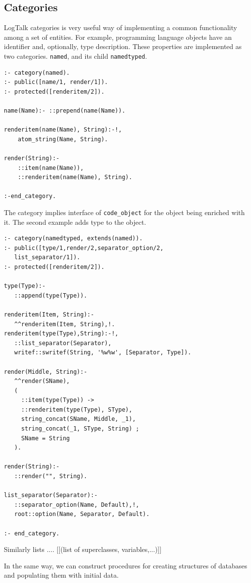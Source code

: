 \documentclass[conference]{IEEEtran}
\begin{document}
\subsection{Categories}
\label{sec:cats-impl}

LogTalk categories is very useful way of implementing a common functionality among a set of entities.  For example, programming language objects have an identifier and, optionally, type description.  These properties are implemented as two categories.
\texttt{named}, and its child \texttt{namedtyped}.
\begin{verbatim}
:- category(named).
:- public([name/1, render/1]).
:- protected([renderitem/2]).

name(Name):- ::prepend(name(Name)).

renderitem(name(Name), String):-!,
    atom_string(Name, String).

render(String):-
    ::item(name(Name)),
    ::renderitem(name(Name), String).

:-end_category.
\end{verbatim}

The category implies interface of \texttt{code\_object} for the object being enriched with it.  The second example adds type to the object.

\begin{verbatim}
:- category(namedtyped, extends(named)).
:- public([type/1,render/2,separator_option/2,
   list_separator/1]).
:- protected([renderitem/2]).

type(Type):-
   ::append(type(Type)).

renderitem(Item, String):-
   ^^renderitem(Item, String),!.
renderitem(type(Type),String):-!,
   ::list_separator(Separator),
   writef::swritef(String, '%w%w', [Separator, Type]).

render(Middle, String):-
   ^^render(SName),
   (
     ::item(type(Type)) ->
     ::renderitem(type(Type), SType),
     string_concat(SName, Middle, _1),
     string_concat(_1, SType, String) ;
     SName = String
   ).

render(String):-
   ::render("", String).

list_separator(Separator):-
   ::separator_option(Name, Default),!,
   root::option(Name, Separator, Default).

:- end_category.
\end{verbatim}

Similarly lists .... [[(list of superclasses, variables,...)]]

In the same way, we can construct procedures for creating structures of databases and populating them with initial data.
\end{document}
